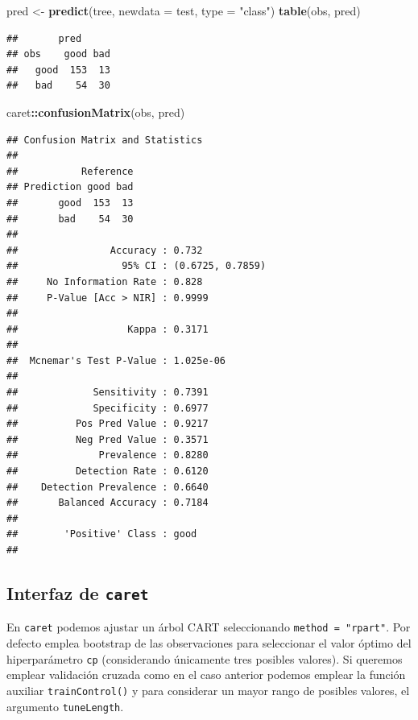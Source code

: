 \documentclass[]{book}
\newenvironment{Shaded}{\begin{snugshade}}{\end{snugshade}}
\newcommand{\KeywordTok}[1]{\textcolor[rgb]{0.13,0.29,0.53}{\textbf{#1}}}
\newcommand{\DataTypeTok}[1]{\textcolor[rgb]{0.13,0.29,0.53}{#1}}
\newcommand{\StringTok}[1]{\textcolor[rgb]{0.31,0.60,0.02}{#1}}
\newcommand{\OperatorTok}[1]{\textcolor[rgb]{0.81,0.36,0.00}{\textbf{#1}}}
\newcommand{\NormalTok}[1]{#1}
\theoremstyle{break}
\theoremstyle{definition}
\theoremstyle{definition}
\theoremstyle{definition}
\theoremstyle{remark}
\begin{document}
\begin{Shaded}
\begin{Highlighting}[]
\NormalTok{pred <-}\StringTok{ }\KeywordTok{predict}\NormalTok{(tree, }\DataTypeTok{newdata =}\NormalTok{ test, }\DataTypeTok{type =} \StringTok{"class"}\NormalTok{)}
\KeywordTok{table}\NormalTok{(obs, pred)}
\end{Highlighting}
\end{Shaded}

\begin{verbatim}
##       pred
## obs    good bad
##   good  153  13
##   bad    54  30
\end{verbatim}

\begin{Shaded}
\begin{Highlighting}[]
\NormalTok{caret}\OperatorTok{::}\KeywordTok{confusionMatrix}\NormalTok{(obs, pred)}
\end{Highlighting}
\end{Shaded}

\begin{verbatim}
## Confusion Matrix and Statistics
## 
##           Reference
## Prediction good bad
##       good  153  13
##       bad    54  30
##                                           
##                Accuracy : 0.732           
##                  95% CI : (0.6725, 0.7859)
##     No Information Rate : 0.828           
##     P-Value [Acc > NIR] : 0.9999          
##                                           
##                   Kappa : 0.3171          
##                                           
##  Mcnemar's Test P-Value : 1.025e-06       
##                                           
##             Sensitivity : 0.7391          
##             Specificity : 0.6977          
##          Pos Pred Value : 0.9217          
##          Neg Pred Value : 0.3571          
##              Prevalence : 0.8280          
##          Detection Rate : 0.6120          
##    Detection Prevalence : 0.6640          
##       Balanced Accuracy : 0.7184          
##                                           
##        'Positive' Class : good            
## 
\end{verbatim}

\subsection{\texorpdfstring{Interfaz de
\texttt{caret}}{Interfaz de caret}}\label{interfaz-de-caret}

En \texttt{caret} podemos ajustar un árbol CART seleccionando
\texttt{method\ =\ "rpart"}. Por defecto emplea bootstrap de las
observaciones para seleccionar el valor óptimo del hiperparámetro
\texttt{cp} (considerando únicamente tres posibles valores). Si queremos
emplear validación cruzada como en el caso anterior podemos emplear la
función auxiliar \texttt{trainControl()} y para considerar un mayor
rango de posibles valores, el argumento \texttt{tuneLength}.
\end{document}
